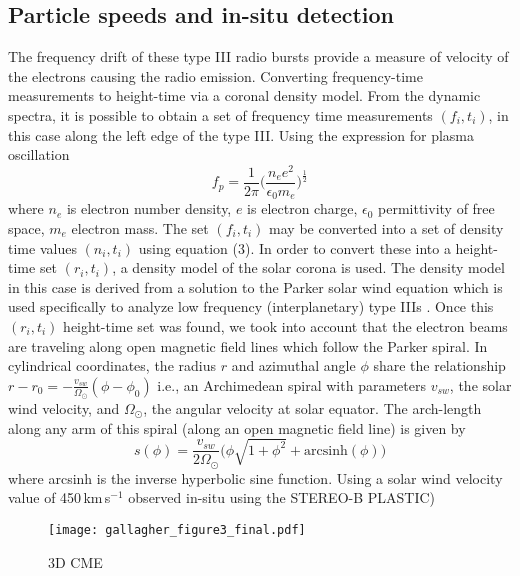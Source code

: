 \subsection{Particle speeds and in-situ detection}
The frequency drift of these type III radio bursts provide a measure of velocity of the electrons causing the radio emission. Converting frequency-time measurements to height-time via a coronal density model. From the dynamic spectra, it is possible to obtain a set of frequency time measurements $(f_i,t_i)$, in this case along the left edge of the type III. Using the expression for plasma oscillation
\begin{equation}
f_p = \frac{1}{2\pi}\bigg(  \frac{n_e e^2}{\epsilon_0 m_e} \bigg)^\frac{1}{2}
\end{equation}
where $n_e$ is electron number density, $e$ is electron charge, $\epsilon_0$ permittivity of free space, $m_e$ electron mass. The set $(f_i,t_i)$ may be converted into a set of density time values $(n_i,t_i)$ using equation (3). In order to convert these into a height-time set $(r_i,t_i)$, a density model of the solar corona is used. The density model in this case is derived from a solution to the Parker solar wind equation which is used specifically to analyze low frequency (interplanetary) type IIIs  \citep{mann1999}. Once this $(r_i,t_i)$ height-time set was found, we took into account that the electron beams are traveling along open magnetic field lines which follow the Parker spiral. In cylindrical coordinates, the radius $r$ and azimuthal angle $\phi$ share the relationship $r-r_0= -\frac{v_{sw}}{\Omega_{\odot}}( \phi - \phi_0)$ i.e., an Archimedean spiral with parameters $v_{sw}$, the solar wind velocity, and $\Omega_{\odot}$, the angular velocity at solar equator. The arch-length along any arm of this spiral (along an open magnetic field line) is given by
\begin{equation}
s(\phi) = \frac{v_{sw}} {2\Omega_{\odot}}\big(\phi\sqrt{1+\phi^2} + \mathrm{arcsinh}(\phi)  \big)
\end{equation}
where arcsinh is the inverse hyperbolic sine function. Using a solar wind velocity value of 450\,km\,s$^{-1}$ observed in-situ using the STEREO-B PLASTIC)
\begin{sidewaysfigure}[!t]
    \centering
\texttt{[image: gallagher\_figure3\_final.pdf]}
\caption{3D CME}
\label{fig:dyn_spec}
\end{sidewaysfigure}
\clearpage
\noindent
